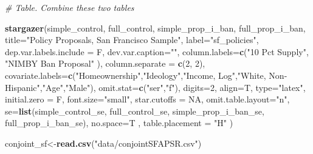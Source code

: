\documentclass[]{article}
\newenvironment{Shaded}{\begin{snugshade}}{\end{snugshade}}
\newcommand{\CommentTok}[1]{\textcolor[rgb]{0.56,0.35,0.01}{\textit{#1}}}
\newcommand{\DataTypeTok}[1]{\textcolor[rgb]{0.13,0.29,0.53}{#1}}
\newcommand{\DecValTok}[1]{\textcolor[rgb]{0.00,0.00,0.81}{#1}}
\newcommand{\KeywordTok}[1]{\textcolor[rgb]{0.13,0.29,0.53}{\textbf{#1}}}
\newcommand{\NormalTok}[1]{#1}
\newcommand{\OtherTok}[1]{\textcolor[rgb]{0.56,0.35,0.01}{#1}}
\newcommand{\StringTok}[1]{\textcolor[rgb]{0.31,0.60,0.02}{#1}}
\begin{document}
\begin{Shaded}
\begin{Highlighting}[]
{{\CommentTok{# Table. Combine these two tables}

\KeywordTok{stargazer}\NormalTok{(simple_control, full_control, simple_prop_i_ban, full_prop_i_ban, }\DataTypeTok{title=}\StringTok{"Policy Proposals, San Francisco Sample"}\NormalTok{,  }\DataTypeTok{label=}\StringTok{"sf_policies"}\NormalTok{,}
          \DataTypeTok{dep.var.labels.include =}\NormalTok{ F, }\DataTypeTok{dev.var.caption=}\StringTok{""}\NormalTok{,}
          \DataTypeTok{column.labels=}\KeywordTok{c}\NormalTok{(}\StringTok{"10 Pct Supply"}\NormalTok{, }\StringTok{"NIMBY Ban Proposal"}\NormalTok{ ), }\DataTypeTok{column.separate =} \KeywordTok{c}\NormalTok{(}\DecValTok{2}\NormalTok{, }\DecValTok{2}\NormalTok{),}
          \DataTypeTok{covariate.labels=}\KeywordTok{c}\NormalTok{(}\StringTok{"Homeownership"}\NormalTok{,}\StringTok{"Ideology"}\NormalTok{,}\StringTok{"Income, Log"}\NormalTok{,}\StringTok{"White, Non-Hispanic"}\NormalTok{,}\StringTok{"Age"}\NormalTok{,}\StringTok{"Male"}\NormalTok{),}
          \DataTypeTok{omit.stat=}\KeywordTok{c}\NormalTok{(}\StringTok{"ser"}\NormalTok{,}\StringTok{"f"}\NormalTok{), }\DataTypeTok{digits=}\DecValTok{2}\NormalTok{, }\DataTypeTok{align=}\NormalTok{T, }\DataTypeTok{type=}\StringTok{"latex"}\NormalTok{,}
          \DataTypeTok{initial.zero =}\NormalTok{ F, }\DataTypeTok{font.size=}\StringTok{"small"}\NormalTok{, }\DataTypeTok{star.cutoffs =} \OtherTok{NA}\NormalTok{, }\DataTypeTok{omit.table.layout=}\StringTok{"n"}\NormalTok{,}
          \DataTypeTok{se=}\KeywordTok{list}\NormalTok{(simple_control_se, full_control_se, simple_prop_i_ban_se, full_prop_i_ban_se), }\DataTypeTok{no.space=}\NormalTok{T , }\DataTypeTok{table.placement =} \StringTok{"H"}\NormalTok{ )}


\NormalTok{conjoint_sf<-}\KeywordTok{read.csv}\NormalTok{(}\StringTok{"data/conjointSFAPSR.csv"}\NormalTok{)}

}}
\end{Highlighting}
\end{Shaded}
\end{document}
